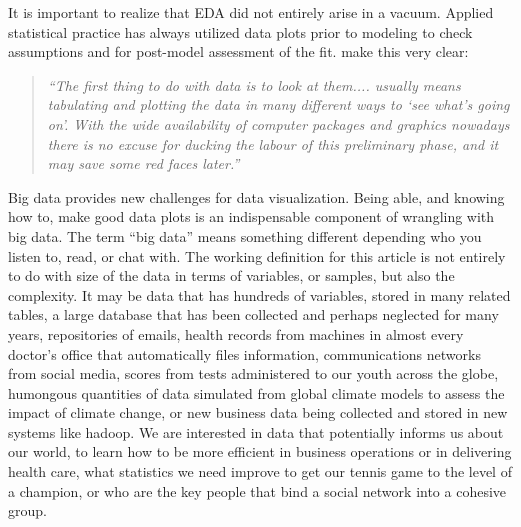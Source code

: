 \documentclass{article}
\begin{document}




It is important to realize that EDA did not entirely arise in a vacuum. Applied statistical practice has always utilized data plots prior to modeling to check assumptions and for post-model assessment of the fit. \citet{CH90} make this very clear:

\begin{quote}
{\em ``The first thing to do with data is to look at them.... usually
means tabulating and plotting the data in many different ways to `see
what's going on'. With the wide availability of computer packages and
graphics nowadays there is no excuse for ducking the labour of this
preliminary phase, and it may save some red faces later.''}
\end{quote}

\noindent Big data provides new challenges for data visualization. Being able, and knowing how to, make good data plots is an indispensable component of wrangling with big data. The term ``big data'' means something different depending who you listen to, read, or chat with. The working definition for this article is not entirely to do with size of the data in terms of variables, or samples, but also the complexity. It may be data that has hundreds of variables, stored in many related tables, a large database that has been collected and perhaps neglected for many years, repositories of emails, health records from machines in almost every doctor's office that automatically files information, communications networks from social media, scores from tests administered to our youth across the globe, humongous quantities of data simulated from global climate models to assess the impact of climate change, or new business data being collected and stored in new systems like hadoop. {\color[rgb]{1,0,0}  We are interested in data that potentially informs  us about our world, to learn how to be more efficient in business operations or in delivering health care, what statistics we need improve to get our tennis game to the level of a champion, or who are the key people that bind a social network into a cohesive group}.
\end{document}
